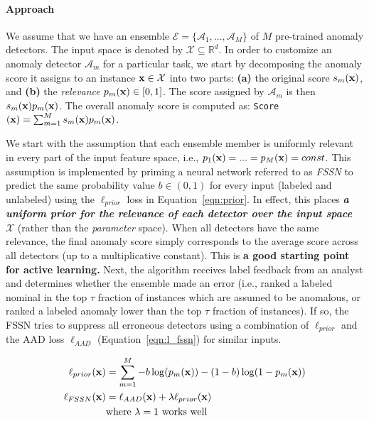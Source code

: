 \documentclass{article}
\begin{document}
\paragraph{Approach} We assume that we have an ensemble $\mathcal{E} = \{\mathcal{A}_1, ..., \mathcal{A}_M\}$ of $M$ pre-trained anomaly detectors. The input space is denoted by $\mathcal{X} \subseteq \mathbb{R}^d$. In order to customize an anomaly detector $\mathcal{A}_m$ for a particular task, we start by decomposing the anomaly score it assigns to an instance ${\bf x} \in \mathcal{X}$ into two parts: {\bf (a)} the original score $s_m({\bf x})$, and {\bf (b)} the \textit{relevance} $p_m({\bf x}) \in [0, 1]$. The score assigned by $\mathcal{A}_m$ is then $s_m({\bf x})p_m({\bf x})$. The overall anomaly score is computed as: \texttt{Score}$({\bf x}) = \sum_{m=1}^M{s_m({\bf x})p_m({\bf x})}$.

We start with the assumption that each ensemble member is uniformly relevant in every part of the input feature space, i.e., $p_1({\bf x}) = ... = p_M({\bf x}) = const$. This assumption is implemented by priming a neural network referred to as \textit{FSSN} to predict the same probability value $b \in (0, 1)$ for every input (labeled and unlabeled) using the $\ell_{prior}$ loss in Equation~\ref{eqn:prior}. In effect, this places \textit{\textbf{a uniform prior for the relevance of each detector over the input space $\mathcal{X}$}}  (rather than the {\em parameter} space). When all detectors have the same relevance, the final anomaly score simply corresponds to the average score across all detectors (up to a multiplicative constant). This is \textbf{a good starting point for active learning.} Next, the algorithm receives label feedback from an analyst and determines whether the ensemble made an error (i.e., ranked a labeled nominal in the top $\tau$ fraction of instances which are assumed to be anomalous, or ranked a labeled anomaly lower than the top $\tau$ fraction of instances). If so, the FSSN tries to suppress all erroneous detectors using a combination of $\ell_{prior}$ and the AAD loss $\ell_{AAD}$ (Equation~\ref{eqn:l_fssn}) for similar inputs.

\begin{align}
\ell_{prior}({\bf x}) &= \sum_{m=1}^M{-b\log(p_m({\bf x})) -(1 - b)\log(1 - p_m({\bf x}))} \label{eqn:prior} \\
\ell_{FSSN}({\bf x}) &= \ell_{AAD}({\bf x}) + \lambda \ell_{prior}({\bf x}) \label{eqn:l_fssn} \\
& \text{where $\lambda=1$ works well} \nonumber
\end{align}
\end{document}
